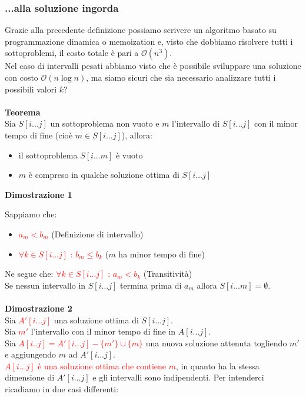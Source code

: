 \documentclass[../cheatSheetAlgoritmi.tex]{subfiles}
\begin{document}
\subsubsection{...alla soluzione ingorda}
Grazie alla precedente definizione possiamo scrivere un algoritmo basato su programmazione dinamica o memoization e, visto che dobbiamo risolvere tutti i sottoproblemi, il costo totale è pari a $\mathcal{O}(n^3)$.\\
Nel caso di intervalli pesati abbiamo visto che è possibile sviluppare una soluzione con costo $\mathcal{O}(n\log{n})$, ma siamo sicuri che sia necessario analizzare tutti i possibili valori $k$?\\\\
\textbf{Teorema}\\
Sia $S[i...j]$ un sottoproblema non vuoto e $m$ l'intervallo di $S[i ...j]$ con il minor tempo di fine (cioè $m \in S[i...j] $), allora:
\begin{itemize}
	\item il sottoproblema $S[i...m]$ è vuoto
	\item $m$ è compreso in qualche soluzione ottima di $S[i ...j]$
\end{itemize}
\newpage
\begin{flushleft}
\textbf{Dimostrazione 1}
\end{flushleft}
Sappiamo che:
\begin{itemize}
	\item  \textcolor{red}{$a_m < b_m$} (Definizione di intervallo)
	\item \textcolor{red}{$\forall k \in S[i...j]$ : $b_m \leq b_k$} ($m$ ha minor tempo di fine)
\end{itemize}
Ne segue che: \textcolor{red}{$\forall k \in S[i...j]$ : $a_m < b_k$} (Transitività)\\
Se nessun intervallo in $S[i...j]$ termina prima di $a_m$ allora $S[i...m] = \emptyset$.\\\\
\textbf{Dimostrazione 2}\\
Sia \textcolor{red}{$A'[i...j]$} una soluzione ottima di $S[i...j]$.\\
Sia \textcolor{red}{$m'$} l'intervallo con il minor tempo di fine in $A[i...j]$.\\
Sia \textcolor{red}{$A[i..j] = A'[i...j] - \{ m' \} \cup \{ m \}$} una nuova soluzione attenuta togliendo $m'$ e aggiungendo $m$ ad $A'[i...j]$.\\
\textcolor{red}{$A[i...j]$ è una soluzione ottima che contiene $m$}, in quanto ha la stessa dimensione di $A'[i...j]$ e gli intervalli sono indipendenti. Per intenderci ricadiamo in due casi differenti:
\end{document}
